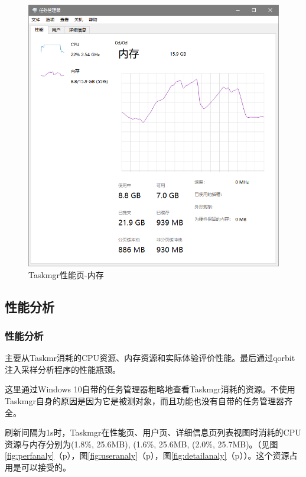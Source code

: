 \documentclass{beamer}
\newcommand\myref[1]{\ref{#1}（p\pageref{#1}）}
\begin{document}
\begin{frame}
    
\begin{figure}
    \centering
    \includegraphics[scale=0.4]{../media/comparison/mgr perfTab mem.png}
    \caption{Taskmgr性能页-内存}
    \label{fig:mgrmem}
\end{figure}
\end{frame}

\subsection{性能分析}
\begin{frame}
    \frametitle{性能分析}
    主要从Taskmr消耗的CPU资源、内存资源和实际体验评价性能。最后通过qorbit注入采样分析程序的性能瓶颈。

这里通过Windows 10自带的任务管理器粗略地查看Taskmgr消耗的资源。不使用Taskmgr自身的原因是因为它是被测对象，而且功能也没有自带的任务管理器齐全。

刷新间隔为1s时，Taskmgr在性能页、用户页、详细信息页列表视图时消耗的CPU资源与内存分别为(1.8\%, 25.6MB), (1.6\%, 25.6MB, (2.0\%, 25.7MB)。（见图\myref{fig:perfanaly}，图\myref{fig:useranaly}，图\myref{fig:detailanaly}）。这个资源占用是可以接受的。
\end{frame}
\end{document}
